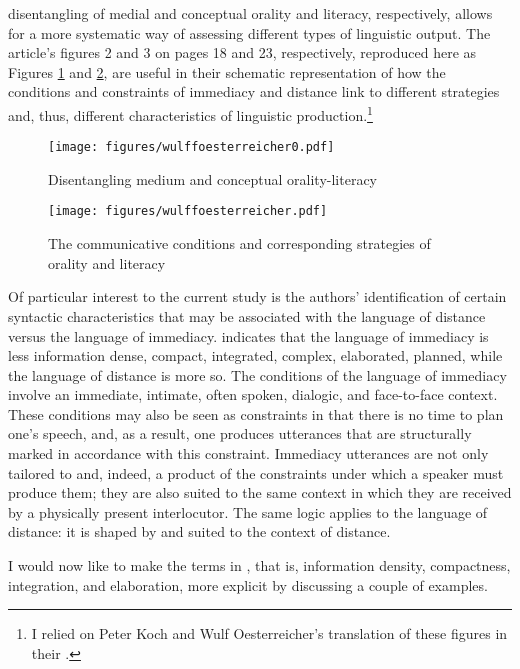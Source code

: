  disentangling of medial and conceptual orality and literacy, respectively, allows for a more systematic way of assessing different types of linguistic output. The article’s figures 2 and 3 on pages 18 and 23, respectively, reproduced here as Figures \ref{fig:3:1} and \ref{fig:3:2}, are useful in their schematic representation of how the conditions and constraints of immediacy and distance link to different strategies and, thus, different characteristics of linguistic production.\footnote{I relied on Peter Koch and Wulf Oesterreicher’s translation of these figures in their \textcite{KochOesterreicher2012}.}

\begin{figure}
\caption{Disentangling medium and conceptual orality-literacy}
\label{fig:3:1}
\texttt{[image: figures/wulffoesterreicher0.pdf]}
\end{figure}


\begin{figure}
\caption{The communicative conditions and corresponding strategies of orality and literacy}
\label{fig:3:2}
\texttt{[image: figures/wulffoesterreicher.pdf]}
\end{figure}


Of particular interest to the current study is the authors’ identification of certain syntactic characteristics that may be associated with the language of distance versus the language of immediacy.  indicates that the language of immediacy is less information dense, compact, integrated, complex, elaborated, planned, while the language of distance is more so. The conditions of the language of immediacy involve an immediate, intimate, often spoken, dialogic, and face-to-face context. These conditions may also be seen as constraints in that there is no time to plan one’s speech, and, as a result, one produces utterances that are structurally marked in accordance with this constraint. Immediacy utterances are not only tailored to and, indeed, a product of the constraints under which a speaker must produce them; they are also suited to the same context in which they are received by a physically present interlocutor. The same logic applies to the language of distance: it is shaped by and suited to the context of distance.

I would now like to make the terms in , that is, information density, compactness, integration, and elaboration, more explicit by discussing a couple of examples.

